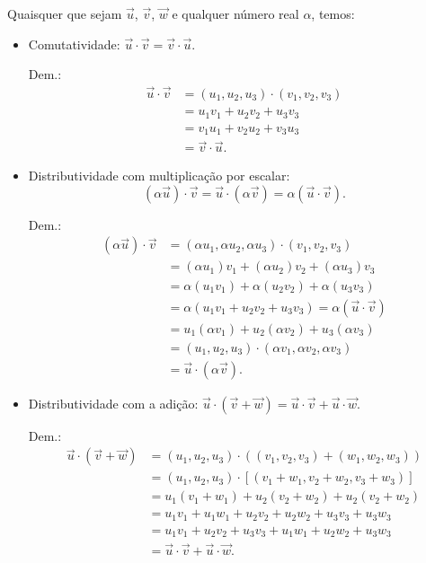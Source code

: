 Quaisquer que sejam $\vec{u}$, $\vec{v}$, $\vec{w}$ e qualquer número real $\alpha$, temos:
\begin{itemize}
\item Comutatividade: $\vec{u}\cdot\vec{v}=\vec{v}\cdot\vec{u}$.

  Dem.:
  \begin{align}
    \vec{u}\cdot\vec{v} &= (u_1,u_2,u_3)\cdot(v_1,v_2,v_3)\\
                        &= u_1v_1+u_2v_2+u_3v_3 \\
                        &= v_1u_1+v_2u_2+v_3u_3 \\
                        &= \vec{v}\cdot\vec{u}.
  \end{align}

\item Distributividade com multiplicação por escalar:
  \begin{equation}
  (\alpha\vec{u})\cdot\vec{v}=\vec{u}\cdot(\alpha\vec{v})=\alpha(\vec{u}\cdot\vec{v}).
\end{equation}


  Dem.:
  \begin{align}
    (\alpha\vec{u})\cdot\vec{v} &= (\alpha u_1,\alpha u_2, \alpha u_3)\cdot (v_1,v_2,v_3)\\
                                &= (\alpha u_1)v_1+(\alpha u_2)v_2 + (\alpha u_3)v_3 \\
                                &= \alpha (u_1v_1)+\alpha (u_2v_2)+\alpha (u_3v_3) \\
                                &= \alpha (u_1v_1+u_2v_2+u_3v_3) = \alpha(\vec{u}\cdot\vec{v})\\
                                &= u_1(\alpha v_1) + u_2(\alpha v_2) + u_3(\alpha v_3) \\
                                &= (u_1,u_2,u_3)\cdot(\alpha v_1,\alpha v_2,\alpha v_3) \\
                                &= \vec{u}\cdot(\alpha\vec{v}).
  \end{align}

\item Distributividade com a adição: $\vec{u}\cdot(\vec{v}+\vec{w}) = \vec{u}\cdot\vec{v}+\vec{u}\cdot\vec{w}$.

  Dem.:
  \begin{align}
    \vec{u}\cdot(\vec{v}+\vec{w}) &= (u_1,u_2,u_3)\cdot\left((v_1,v_2,v_3)+(w_1,w_2,w_3)\right) \\
                                  &= (u_1,u_2,u_3)\cdot [(v_1+w_1,v_2+w_2,v_3+w_3)] \\
                                  &= u_1(v_1+w_1) + u_2(v_2+w_2) + u_2(v_2+w_2) \\
                                  &= u_1v_1+u_1w_1+u_2v_2+u_2w_2+u_3v_3+u_3w_3 \\
                                  &= u_1v_1+u_2v_2+u_3v_3 + u_1w_1+u_2w_2+u_3w_3 \\
                                  &= \vec{u}\cdot\vec{v}+\vec{u}\cdot\vec{w}.
  \end{align}


\end{itemize}
